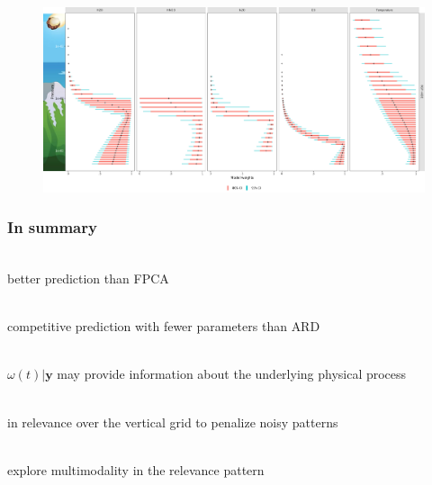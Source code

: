 \documentclass[handout]{snedecorbeamer}
\begin{document}
\begin{frame}[c]
  \begin{figure}
    \centering
    \includegraphics[width=1\textwidth]{image2934-8.png}
  \end{figure}
\end{frame}

\begin{frame}
  \frametitle{In summary}

  \begingroup
  \begin{description}[<+->]
  \item[No dimension reduction] \mbox{}\\
    better prediction than \textsc{FPCA}
  \item[Parsimony] \mbox{}\\
    competitive prediction with fewer parameters than \textsc{ARD}
  \item[Interpretability] \mbox{}\\
    $\omega(t) | \mathbf{y}$ may provide information about the underlying
    physical process
  \item[Smoothness] \mbox{}\\
    in relevance over the vertical grid to penalize noisy patterns
  \item[Next steps] \mbox{}\\
    explore multimodality in the relevance pattern
  \end{description}
  \endgroup
\end{frame}
\end{document}

